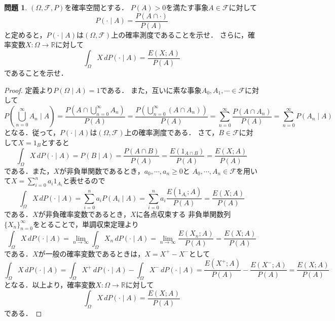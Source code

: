\documentclass{jsarticle}
\theoremstyle{definition}
\newtheorem{qst}{問題}
\begin{document}
\begin{qst}
$(\Omega,\mathcal{F},P)$を確率空間とする．
$P(A)>0$を満たす事象$A\in\mathcal{F}$に対して
\[ P(\cdot\mid A)=\frac{P(A\cap\cdot)}{P(A)} \]
と定めると，$P(\cdot\mid A)$は$(\Omega,\mathcal{F})$上の確率測度であることを示せ．
さらに，確率変数$X\colon\Omega\to\mathbb{R}$に対して
\[ \int_\Omega X\,dP(\cdot\mid A)=\frac{E(X;A)}{P(A)} \]
であることを示せ．
\end{qst}
\begin{proof}
定義より$P(\Omega\mid A)=1$である．
また，互いに素な事象$A_0,A_1,\cdots\in\mathcal{F}$に対して
\[
P\left(\bigcup_{n=0}^\infty A_n\mid A\right)
=\frac{P(A\cap\bigcup_{n=0}^\infty A_n)}{P(A)}
=\frac{P(\bigcup_{n=0}^\infty(A\cap A_n))}{P(A)}
=\sum_{n=0}^\infty\frac{P(A\cap A_n)}{P(A)}
=\sum_{n=0}^\infty P(A_n\mid A)
\]
となる．従って，$P(\cdot\mid A)$は$(\Omega,\mathcal{F})$上の確率測度である．
さて，$B\in\mathcal{F}$に対して$X=1_B$とすると
\[
\int_\Omega X\,dP(\cdot\mid A)
=P(B\mid A)=\frac{P(A\cap B)}{P(A)}=\frac{E(1_{A\cap B})}{P(A)}
=\frac{E(X;A)}{P(A)}
\]
である．また，$X$が非負単関数であるとき，$a_0,\cdots,a_n\geq0$と
$A_0,\cdots,A_n\in\mathcal{F}$を用いて$X=\sum_{i=0}^na_i1_{A_i}$と表せるので
\[
\int_\Omega X\,dP(\cdot\mid A)
=\sum_{i=0}^na_iP(A_i\mid A)=\sum_{i=0}^na_i\frac{E(1_{A_i};A)}{P(A)}
=\frac{E(X;A)}{P(A)}
\]
である．$X$が非負確率変数であるとき，$X$に各点収束する
非負単関数列$\{X_n\}_{n=0}^\infty$をとることで，単調収束定理より
\[
\int_\Omega X\,dP(\cdot\mid A)
=\lim_{n\to\infty}\int_\Omega X_n\,dP(\cdot\mid A)=\lim_{n\to\infty}\frac{E(X_n;A)}{P(A)}
=\frac{E(X;A)}{P(A)}
\]
である．$X$が一般の確率変数であるときは，$X=X^+-X^-$として
\[
\int_\Omega X\,dP(\cdot\mid A)
=\int_\Omega X^+\,dP(\cdot\mid A)-\int_\Omega X^-\,dP(\cdot\mid A)
=\frac{E(X^+;A)}{P(A)}-\frac{E(X^-;A)}{P(A)}=\frac{E(X;A)}{P(A)}
\]
となる．以上より，確率変数$X\colon\Omega\to\mathbb{R}$に対して
\[ \int_\Omega X\,dP(\cdot\mid A)=\frac{E(X;A)}{P(A)} \]
である．
\end{proof}
\end{document}

